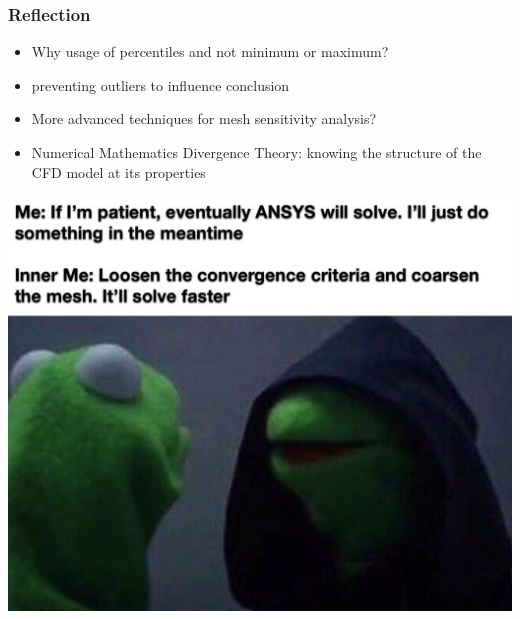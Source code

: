 \documentclass[11pt,t]{beamer}
\begin{document}
    \begin{frame}
        \frametitle{Reflection}
        \begin{itemize}
            \item<2-> Why usage of percentiles and not minimum or maximum?
            \item<3->[$\rightarrow$] preventing outliers to influence conclusion
            \item<4-> More advanced techniques for mesh sensitivity analysis?
            \item<5->[$\rightarrow$] Numerical Mathematics Divergence Theory: knowing the structure of the CFD model at its properties
        \end{itemize}
    \end{frame}

    \begin{frame}
        \begin{center}
            \includegraphics[width=\textwidth]{IMG_3565.jpg}    
        \end{center}
    \end{frame}
\end{document}
